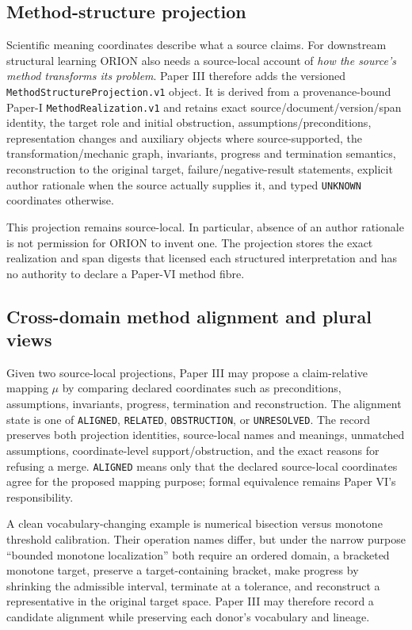 \subsection{Method-structure projection}
\label{sec:method-structure-projection}

Scientific meaning coordinates describe what a source claims. For downstream structural learning ORION also needs a source-local account of \emph{how the source's method transforms its problem}. Paper III therefore adds the versioned \texttt{MethodStructureProjection.v1} object. It is derived from a provenance-bound Paper-I \texttt{MethodRealization.v1} and retains exact source/document/version/span identity, the target role and initial obstruction, assumptions/preconditions, representation changes and auxiliary objects where source-supported, the transformation/mechanic graph, invariants, progress and termination semantics, reconstruction to the original target, failure/negative-result statements, explicit author rationale when the source actually supplies it, and typed \texttt{UNKNOWN} coordinates otherwise.

This projection remains source-local. In particular, absence of an author rationale is not permission for ORION to invent one. The projection stores the exact realization and span digests that licensed each structured interpretation and has no authority to declare a Paper-VI method fibre.

\subsection{Cross-domain method alignment and plural views}
\label{sec:method-alignment}

Given two source-local projections, Paper III may propose a claim-relative mapping $\mu$ by comparing declared coordinates such as preconditions, assumptions, invariants, progress, termination and reconstruction. The alignment state is one of \texttt{ALIGNED}, \texttt{RELATED}, \texttt{OBSTRUCTION}, or \texttt{UNRESOLVED}. The record preserves both projection identities, source-local names and meanings, unmatched assumptions, coordinate-level support/obstruction, and the exact reasons for refusing a merge. \texttt{ALIGNED} means only that the declared source-local coordinates agree for the proposed mapping purpose; formal equivalence remains Paper VI's responsibility.

A clean vocabulary-changing example is numerical bisection versus monotone threshold calibration. Their operation names differ, but under the narrow purpose ``bounded monotone localization'' both require an ordered domain, a bracketed monotone target, preserve a target-containing bracket, make progress by shrinking the admissible interval, terminate at a tolerance, and reconstruct a representative in the original target space. Paper III may therefore record a candidate alignment while preserving each donor's vocabulary and lineage.

